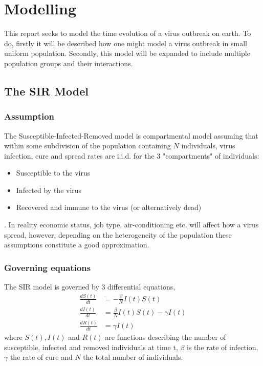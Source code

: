 \section{Modelling}
This report seeks to model the time evolution of a virus outbreak on earth. To do, firstly it will be described how one might model a virus outbreak in small uniform population. Secondly, this model will be expanded to include multiple population groups and their interactions. 

\subsection{The SIR Model}
\subsubsection{Assumption}
The Susceptible-Infected-Removed model is compartmental model assuming that within some subdivision of the population containing $N$ individuals, virus infection, cure and spread rates are i.i.d. for the 3 "compartments" of individuals:
\begin{itemize}
	\item Susceptible to the virus
	\item Infected by the virus
	\item Recovered and immune to the virus (or alternatively dead)
\end{itemize} 
. In reality economic status, job type, air-conditioning etc. will affect how a virus spread, however, depending on the heterogeneity of the population these assumptions constitute a good approximation. 

\subsubsection{Governing equations}
The SIR model is governed by 3 differential equations,
\begin{align}
\frac{d S(t)}{dt} &= - \frac{\beta}{N} I(t) S(t)   \label{eq-S}\\
\frac{d I(t)}{dt} &= \frac{\beta}{N} I(t) S(t) - \gamma I(t)  \label{eq-I}\\
\frac{d R(t)}{dt} &= \gamma I(t) \label{eq-R}
\end{align}
where $S(t), I(t)$ and $R(t)$ are functions describing the number of susceptible, infected and removed individuals at time t, $\beta$ is the rate of infection, $\gamma$ the rate of cure and $N$ the total number of individuals.

